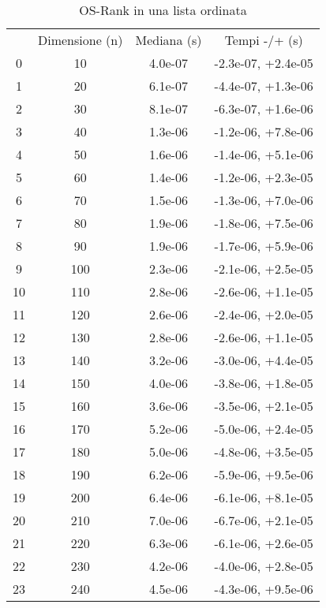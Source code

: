 \begin{table}
\centering
\caption{OS-Rank in una lista ordinata}
\label{OS-Rank in una lista ordinata}
\begin{adjustbox}{width=1\textwidth/2}
\begin{tabular}{|c|c|c|c|}
\hline
 & Dimensione (n) & Mediana (s) & Tempi -/+ (s) \\
0 & 10 & 4.0e-07 & -2.3e-07, +2.4e-05 \\
\cline{1-4}
1 & 20 & 6.1e-07 & -4.4e-07, +1.3e-06 \\
\cline{1-4}
2 & 30 & 8.1e-07 & -6.3e-07, +1.6e-06 \\
\cline{1-4}
3 & 40 & 1.3e-06 & -1.2e-06, +7.8e-06 \\
\cline{1-4}
4 & 50 & 1.6e-06 & -1.4e-06, +5.1e-06 \\
\cline{1-4}
5 & 60 & 1.4e-06 & -1.2e-06, +2.3e-05 \\
\cline{1-4}
6 & 70 & 1.5e-06 & -1.3e-06, +7.0e-06 \\
\cline{1-4}
7 & 80 & 1.9e-06 & -1.8e-06, +7.5e-06 \\
\cline{1-4}
8 & 90 & 1.9e-06 & -1.7e-06, +5.9e-06 \\
\cline{1-4}
9 & 100 & 2.3e-06 & -2.1e-06, +2.5e-05 \\
\cline{1-4}
10 & 110 & 2.8e-06 & -2.6e-06, +1.1e-05 \\
\cline{1-4}
11 & 120 & 2.6e-06 & -2.4e-06, +2.0e-05 \\
\cline{1-4}
12 & 130 & 2.8e-06 & -2.6e-06, +1.1e-05 \\
\cline{1-4}
13 & 140 & 3.2e-06 & -3.0e-06, +4.4e-05 \\
\cline{1-4}
14 & 150 & 4.0e-06 & -3.8e-06, +1.8e-05 \\
\cline{1-4}
15 & 160 & 3.6e-06 & -3.5e-06, +2.1e-05 \\
\cline{1-4}
16 & 170 & 5.2e-06 & -5.0e-06, +2.4e-05 \\
\cline{1-4}
17 & 180 & 5.0e-06 & -4.8e-06, +3.5e-05 \\
\cline{1-4}
18 & 190 & 6.2e-06 & -5.9e-06, +9.5e-06 \\
\cline{1-4}
19 & 200 & 6.4e-06 & -6.1e-06, +8.1e-05 \\
\cline{1-4}
20 & 210 & 7.0e-06 & -6.7e-06, +2.1e-05 \\
\cline{1-4}
21 & 220 & 6.3e-06 & -6.1e-06, +2.6e-05 \\
\cline{1-4}
22 & 230 & 4.2e-06 & -4.0e-06, +2.8e-05 \\
\cline{1-4}
23 & 240 & 4.5e-06 & -4.3e-06, +9.5e-06 \\

\end{tabular}
\end{adjustbox}
\end{table}
